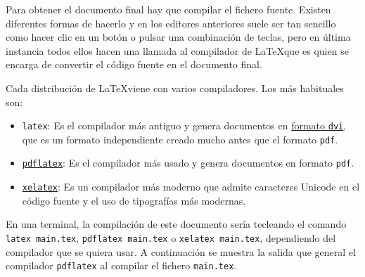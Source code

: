 \documentclass[
  letterpaper,
  DIV=11,
  numbers=noendperiod]{scrreport}
\providecommand{\tightlist}{%
  \setlength{\itemsep}{0pt}\setlength{\parskip}{0pt}}\usepackage{longtable,booktabs,array}
\begin{document}
Para obtener el documento final hay que compilar el fichero fuente.
Existen diferentes formas de hacerlo y en los editores anteriores suele
ser tan sencillo como hacer clic en un botón o pulsar una combinación de
teclas, pero en última instancia todos ellos hacen una llamada al
compilador de \LaTeX que es quien se encarga de convertir el código
fuente en el documento final.

Cada distribución de \LaTeX viene con varios compiladores. Los más
habituales son:

\begin{itemize}
\tightlist
\item
  \texttt{latex}: Es el compilador más antiguo y genera documentos en
  \href{https://es.wikipedia.org/wiki/DVI_(TeX)}{formato \texttt{dvi}},
  que es un formato independiente creado mucho antes que el formato
  \texttt{pdf}.
\item
  \href{https://www.tug.org/applications/pdftex/}{\texttt{pdflatex}}: Es
  el compilador más usado y genera documentos en formato \texttt{pdf}.
\item
  \href{https://tug.org/xetex/}{\texttt{xelatex}}: Es un compilador más
  moderno que admite caracteres Unicode en el código fuente y el uso de
  tipografías más modernas.
\end{itemize}

En una terminal, la compilación de este documento sería tecleando el
comando \texttt{latex\ main.tex}, \texttt{pdflatex\ main.tex} o
\texttt{xelatex\ main.tex}, dependiendo del compilador que se quiera
usar. A continuación se muestra la salida que general el compilador
\texttt{pdflatex} al compilar el fichero \texttt{main.tex}.
\end{document}
